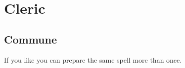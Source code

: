 \chapter{Cleric}
  
 
\section{Commune}   
 

If you like you can prepare the same spell more than once.

 
